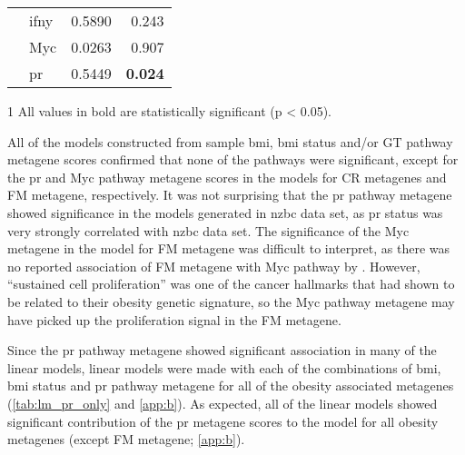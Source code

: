 \begin{table}[htpb]
\begin{threeparttable}
\begin{tabular}{llrr}
                                                                       & \gls{ifny} & 0.5890  & 0.243\\
                                                                       & Myc        & 0.0263  & 0.907\\
                                                                       & \gls{pr}   & 0.5449  & \textbf{0.024}\\
			\hline
			\hline
		\end{tabular}
		\begin{tablenotes}
			\begin{footnotesize}
				\item [1] All values in bold are statistically significant (p \textless{} 0.05).
			\end{footnotesize}
		\end{tablenotes}
	\end{threeparttable}
\end{table}

All of the models constructed from sample \gls{bmi}, \gls{bmi} status and/or GT pathway metagene scores confirmed that none of the pathways were significant, except for the \gls{pr} and Myc pathway metagene scores in the models for CR metagenes and FM metagene, respectively.
It was not surprising that the \gls{pr} pathway metagene showed significance in the models generated in \gls{nzbc} data set, as \gls{pr} status was very strongly correlated with \gls{nzbc} data set.
The significance of the Myc metagene in the model for FM metagene was difficult to interpret, as there was no reported association of FM metagene with Myc pathway by \citet{Fuentes-Mattei2014}.
However, ``sustained cell proliferation'' was one of the cancer hallmarks that \citet{Fuentes-Mattei2014} had shown to be related to their obesity genetic signature, so the Myc pathway metagene may have picked up the proliferation signal in the FM metagene.

Since the \gls{pr} pathway metagene showed significant association in many of the linear models, linear models were made with each of the combinations of \gls{bmi}, \gls{bmi} status and \gls{pr} pathway metagene for all of the obesity associated metagenes (\cref{tab:lm_pr_only} and \cref{app:b}).
As expected, all of the linear models showed significant contribution of the \gls{pr} metagene scores to the model for all obesity metagenes (except FM metagene; \cref{app:b}).

